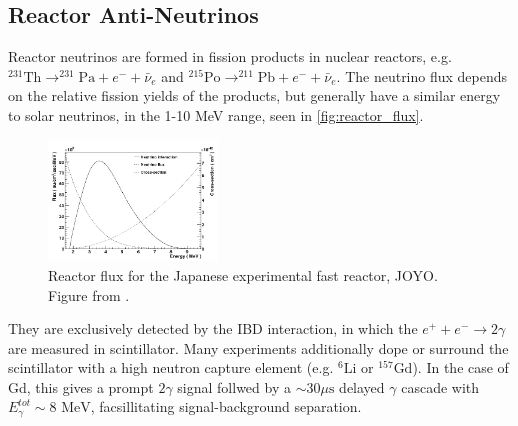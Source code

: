 \subsection{Reactor Anti-Neutrinos}
Reactor neutrinos are formed in fission products in nuclear reactors, e.g. $^{231}\text{Th} \rightarrow ^{231}\text{Pa} + e^- + \bar{\nu}_e$ and $^{215}\text{Po} \rightarrow ^{211}\text{Pb} + e^- + \bar{\nu}_e$. The neutrino flux depends on the relative fission yields of the products, but generally have a similar energy to solar neutrinos, in the 1-10 MeV range, seen in \autoref{fig:reactor_flux}.
\begin{figure}[h]
	\includegraphics[width=0.4\textwidth, trim={0mm 0mm 0mm 0mm}, clip,page=1]{figures/theory/reactor_flux}
	\caption{Reactor flux for the Japanese experimental fast reactor, JOYO. Figure from \cite{reactor_flux}.}
	\label{fig:reactor_flux}
\end{figure}

They are exclusively detected by the IBD interaction, in which the $e^+ + e^- \rightarrow 2\gamma$ are measured in scintillator. Many experiments additionally dope or surround the scintillator with a high neutron capture element (e.g. $^{6}\text{Li}$ or $^{157}\text{Gd}$). In the case of Gd, this gives a prompt $2\gamma$ signal follwed by a $\sim30\mu\text{s}$ delayed $\gamma$ cascade with $E_\gamma^{tot}\sim8\text{ MeV}$, facsillitating signal-background separation. 

